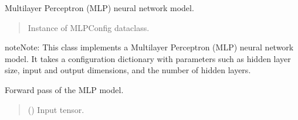 \documentclass[letterpaper,10pt,english]{sphinxmanual}
\begin{document}
\label{\detokenize{index:module-hypyml.models}}

\begin{fulllineitems}
\label{\detokenize{index:hypyml.models.MLP}}
\pysigstartsignatures
{}
\pysigstopsignatures
\sphinxAtStartPar
Multilayer Perceptron (MLP) neural network model.

\begin{fulllineitems}
\label{\detokenize{index:hypyml.models.MLP.config}}
\pysigstartsignatures
{}
\pysigstopsignatures\begin{quote}\begin{description}
\sphinxAtStartPar
Instance of MLPConfig dataclass.

\end{description}\end{quote}

\end{fulllineitems}


\begin{sphinxadmonition}{note}{Note:}
\sphinxAtStartPar
This class implements a Multilayer Perceptron (MLP) neural network model.
It takes a configuration dictionary with parameters such as hidden layer size,
input and output dimensions, and the number of hidden layers.
\end{sphinxadmonition}

\begin{fulllineitems}
\label{\detokenize{index:hypyml.models.MLP.forward}}
\pysigstartsignatures
{}
\pysigstopsignatures
\sphinxAtStartPar
Forward pass of the MLP model.
\begin{quote}\begin{description}
\sphinxAtStartPar
{} () \textendash{} Input tensor.


\end{description}
\end{quote}
\end{fulllineitems}
\end{fulllineitems}
\end{document}
